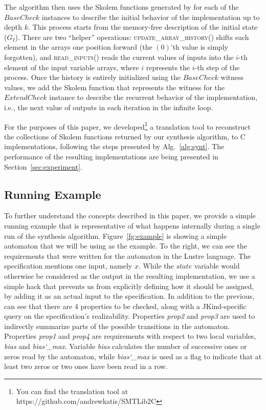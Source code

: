 The algorithm then uses the Skolem functions generated by \aeval for each
of the $\mathit{BaseCheck}$ instances to describe the initial behavior of
the implementation up to depth $k$.  This process starts from the memory-free
description of the initial state ($G_I$). 
There are two ``helper'' operations:
\textsc{update\_array\_history()} shifts each element in the arrays one position forward
(the $(0)$'th value is simply forgotten), and \textsc{read\_inputs()} reads the
current values of inputs into the $i$-th element of the input variable arrays,
where $i$ represents the $i$-th step of the process.
Once the history is entirely initialized using the $\mathit{BaseCheck}$ witness values,
we add the Skolem function that represents the witness for the
$\mathit{ExtendCheck}$ instance to describe the recurrent behavior of the implementation, i.e.,
the next value of outputs in each iteration in the infinite loop.

For the purposes of this paper, we developed\footnote{You can find the translation tool at
https://github.com/andrewkatis/SMTLib2C} a translation tool to reconstruct
the collections of Skolem functions returned by our synthesis algorithm, to C
implementations, following the steps presented by
Alg.~\ref{alg:synt}. The performance of the resulting implementations are
being presented in Section~\ref{sec:experiment}.

 
 \subsection{Running Example}
 
 To further understand the concepts described in this paper, we provide a simple
 running example that is representative of what happens internally during a
 single run of the synthesis algorithm. Figure~\ref{fg:example} is showing a
 simple automaton that we will be using as the example. To the right, we can see
 the requirements that were written for the automaton in the Lustre language.
 The specification mentions one input, namely $x$. While the $state$ variable
 would otherwise be considered as the output in the resulting implementation,
 we use a simple hack that prevents us from explicitly defining how it should
 be assigned, by adding it as an actual input to the specification. In addition
 to the previous, can see that there are 4 properties to be checked, along with a
 JKind-specific query on the specification's realizability. Properties
 \textit{prop2} and \textit{prop3} are used to indirectly summarize parts of the
 possible transitions in the automaton. Properties \textit{prop1} and
 \textit{prop4} are requirements with respect to two local variables, \textit{bias}
 and \textit{bias\char`_max}. Variable \textit{bias} calculates the number of successive
 ones or zeros read by the automaton, while \textit{bias\char`_max} is used as a flag
 to indicate that at least two zeros or two ones have been read in a row.
 
